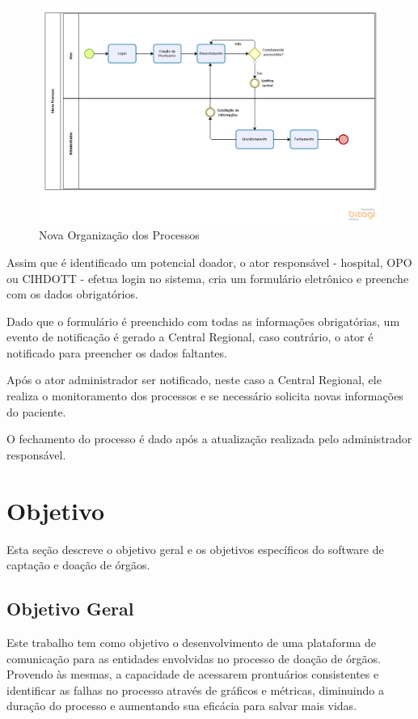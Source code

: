\documentclass[portuguese,oneside]{tcc}
\begin{document}
\begin{figure}[htp]
\centering
\caption{Nova Organização dos Processos}
\includegraphics[width=16cm]{modelagem-novo-processo}

\label{fig:novo-processo}
\end{figure}

Assim que é identificado um potencial doador, o ator responsável - hospital, OPO ou CIHDOTT - efetua login no sistema, cria um formulário eletrônico e preenche com os dados obrigatórios.

Dado que o formulário é preenchido com todas as informações obrigatórias, um evento de notificação é gerado a Central Regional, caso contrário, o ator é notificado para preencher os dados faltantes.

Após o ator administrador ser notificado, neste caso a Central Regional, ele realiza o monitoramento dos processos e se necessário solicita novas informações do paciente.

O fechamento do processo é dado após a atualização realizada pelo administrador responsável.

\section{Objetivo}
Esta seção descreve o objetivo geral e os objetivos específicos do software de captação e doação de órgãos.


\subsection{Objetivo Geral}
Este trabalho tem como objetivo o desenvolvimento de uma plataforma de comunicação para as entidades envolvidas no processo de doação de órgãos. Provendo às mesmas, a capacidade de acessarem prontuários consistentes e identificar as falhas no processo através de gráficos e métricas, diminuindo a duração do processo e aumentando sua eficácia para salvar mais vidas.
\end{document}
